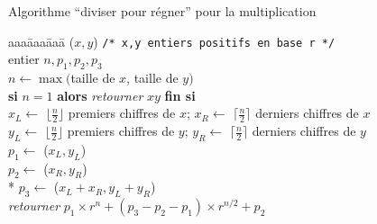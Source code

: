 \begin{frame}{Algorithme ``diviser pour régner'' pour la multiplication}
  \begin{tabbing}
    aaa\=aaa\=aaa\=\kill
    \textbf{}($x,y$) \texttt{/* x,y entiers positifs en base r */} \\
    \> entier $n,p_1,p_2,p_3$ \\
    \> $n \leftarrow \max($taille de $x$, taille de $y)$ \\
    \> \textbf{si} $n = 1$ \textbf{alors} \textsl{retourner} $xy$ \textbf{fin si}\\
    \> $x_L \leftarrow$ $\lfloor  \frac{n}{2} \rfloor$ premiers chiffres de $x$;
     $x_R \leftarrow$ $\lceil \frac{n}{2} \rceil$ derniers chiffres  de $x$ \\ 
    \> $y_L \leftarrow$ $\lfloor \frac{n}{2} \rfloor$ premiers chiffres de $y$;
     $y_R \leftarrow$ $\lceil \frac{n}{2} \rceil$ derniers chiffres de $y$  \\
    \> $p_1 \leftarrow $ \textbf{}($x_L,y_L$) \\
    \> $p_2 \leftarrow $ \textbf{}($x_R,y_R$) \\*
    \> $p_3 \leftarrow $ \textbf{}($x_L+x_R,y_L+y_R$) \\
    \> \textsl{retourner} $p_1 \times r^n + (p_3 - p_2 - p_1) \times r^{n/2} + p_2$
  \end{tabbing}
  
\end{frame}


